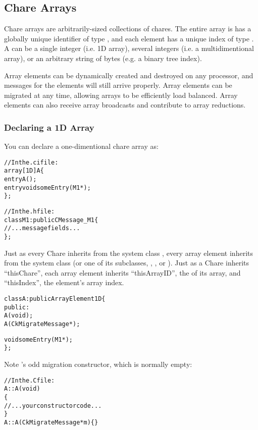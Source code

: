 \subsection{Chare Arrays}

Chare arrays  are arbitrarily-sized collections of chares.  The
entire array is has a globally unique identifier of type , and
each element has a unique index of type .  A 
can be a single integer (i.e. 1D array), several integers (i.e. a
multidimentional array), or an arbitrary string of bytes (e.g. a binary tree
index).

Array elements can be dynamically created and destroyed on any processor,
and messages for the elements will still arrive properly.
Array elements can be migrated at any time, allowing arrays to be efficiently
load balanced.  Array elements can also receive array broadcasts and
contribute to array reductions.

\subsubsection{Declaring a 1D Array}

You can declare a one-dimentional chare array
as:

\begin{alltt}
//In the .ci file:
array [1D] A \{
  entry A();
  entry void someEntry(M1 *);
\};

//In the .h file:
class M1:public CMessage_M1 \{
//...message fields...
\};
\end{alltt}

Just as every Chare inherits from the system class , every 
array element inherits from the system class  (or one
of its subclasses, , , or 
). Just as a Chare inherits ``thisChare'', each
array element inherits ``thisArrayID'', the  of its array,
and ``thisIndex'', the element's array index.

\begin{alltt}
class A : public ArrayElement1D \{
  public:
    A(void);
    A(CkMigrateMessage *);

    void someEntry(M1 *);
\};
\end{alltt}

Note 's odd migration constructor, which is normally empty:

\begin{alltt}
//In the .C file:
A::A(void)
\{
  //...your constructor code...
\}
A::A(CkMigrateMessage *m) \{ \}
\end{alltt}

